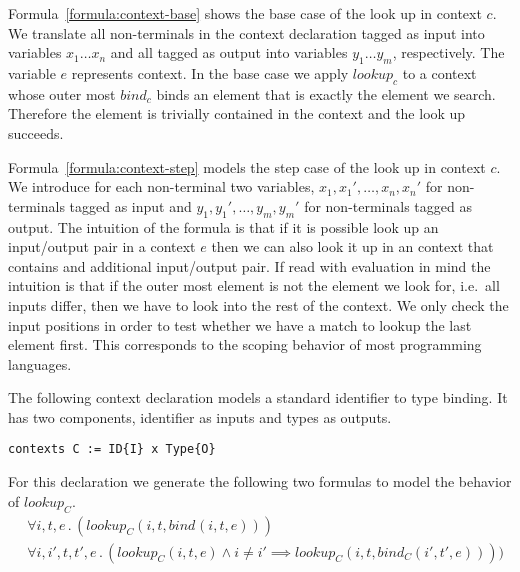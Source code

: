 Formula~\ref{formula:context-base} shows the base case of the look up
in context $c$. We translate all non-terminals in the context
declaration tagged as input into variables $x_1 \dots x_n$ and all
tagged as output into variables $y_1 \dots y_m$, respectively. The
variable $e$ represents context. In the base case we apply $lookup_c$
to a context whose outer most $bind_c$ binds an element that is
exactly the element we search. Therefore the element is trivially
contained in the context and the look up succeeds.

Formula~\ref{formula:context-step} models the step case of the look up
in context $c$. We introduce for each non-terminal two variables,
$x_1,x_1', \dots, x_n,x_n'$ for non-terminals tagged as input and
$y_1,y_1', \dots, y_m,y_m'$ for non-terminals tagged as output. The
intuition of the formula is that if it is possible look up an
input/output pair in a context $e$ then we can also look it up in an
context that contains and additional input/output pair. If read with
evaluation in mind the intuition is that if the outer most element is
not the element we look for, i.e.\ all inputs differ, then we have to
look into the rest of the context. We only check the input positions
in order to test whether we have a match to lookup the last element
first. This corresponds to the scoping behavior of most programming
languages.

\begin{example}
  The following context declaration models a standard identifier to
  type binding. It has two components, identifier as inputs and types
  as outputs.
\begin{lstlisting}[language=sltc]
contexts C := ID{I} x Type{O}
\end{lstlisting}
  For this declaration we generate the following two formulas to model
  the behavior of $lookup_{C}$.
  \begin{align}
    &\forall i, t, e \,.\, (lookup_{C}(i, t, bind_{}(i, t,
    e))) \\
    &\forall i,i',t,t',e \,.\, (lookup_{C}(i, t, e) \land i \neq
    i' \implies lookup_{C}(i, t, bind_{C}(i', t', e))))
  \end{align}
\label{ex:context-formulas}
\end{example}

